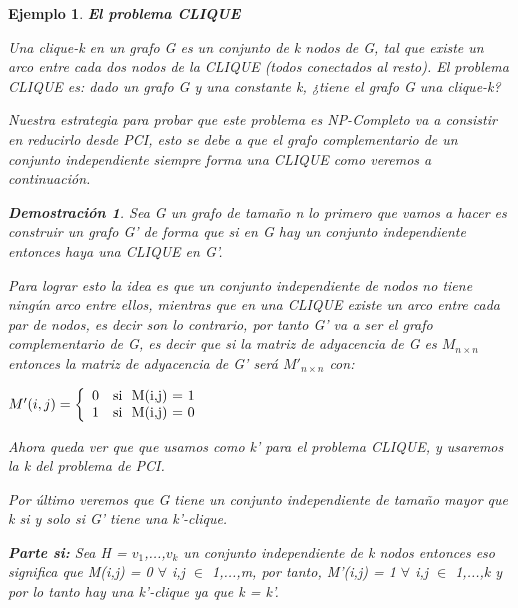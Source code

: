 \documentclass[a4paper,12pt,titlepage]{article}
\newtheorem{eje}{Ejemplo}[section]
\newtheorem*{dem}{\textbf{Demostraci\'on}}
\begin{document}
\begin{eje}
\textbf{El problema CLIQUE}
\vspace{\baselineskip}

Una clique-k en un grafo G es un conjunto de k nodos de G, tal que existe un arco entre cada dos nodos de la CLIQUE (todos conectados al resto). El problema CLIQUE es: dado un grafo G y una constante k, ¿tiene el grafo G una clique-k?

Nuestra estrategia para probar que este problema es NP-Completo va a consistir en reducirlo desde PCI, esto se debe a que el grafo complementario de un conjunto independiente siempre forma una CLIQUE como veremos a continuaci\'on.

\begin{dem}

Sea G un grafo de tamaño n lo primero que vamos a hacer es construir un grafo G' de forma que si en G hay un conjunto independiente entonces haya una CLIQUE en G'.

Para lograr esto la idea es que un conjunto independiente de nodos no tiene ning\'un arco entre ellos, mientras que en una CLIQUE existe un arco entre cada par de nodos, es decir son lo contrario, por tanto G' va a ser el grafo complementario de G, es decir que si la matriz de adyacencia de G es $M_{n\times n}$ entonces la matriz de adyacencia de G' ser\'a $M'_{n\times n}$ con:

\vspace{\baselineskip}

\begin{center}

$ M'(i,j) = \left \lbrace
\begin{array}{l l}
0 & \mbox{si }\mbox{ M(i,j) = 1} \\
1 & \mbox{si }\mbox{ M(i,j) = 0}
\end{array}
\right. $

\end{center}

\vspace{\baselineskip}

Ahora queda ver que que usamos como k' para el problema CLIQUE, y usaremos la k del problema de PCI.

Por \'ultimo veremos que G tiene un conjunto independiente de tamaño mayor que k  si y solo si G' tiene una k'-clique.

\vspace{\baselineskip}

\textbf{Parte si:} Sea H = {$v_1$,...,$v_k$} un conjunto independiente de k nodos entonces eso significa que M(i,j) = 0 $\forall$ i,j $\in$ {1,...,m}, por tanto, M'(i,j) = 1 $\forall$ i,j $\in$ {1,...,k} y por lo tanto hay una k'-clique ya que k = k'.


\end{dem}
\end{eje}
\end{document}
